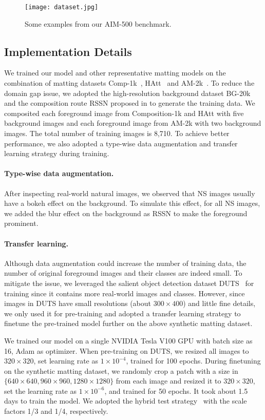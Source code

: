 \documentclass{article}
\begin{document}
\begin{figure}[t]
    \texttt{[image: dataset.jpg]}
    \caption{Some examples from our AIM-500 benchmark.}
    \label{fig:dataset}
\end{figure}


\subsection{Implementation Details}

We trained our model and other representative matting models on the combination of matting datasets Comp-1k~\cite{xu2017deep}, HAtt~\cite{Qiao_2020_CVPR} and AM-2k~\cite{gfm}. To reduce the domain gap issue, we adopted the high-resolution background dataset BG-20k and the composition route RSSN proposed in \cite{gfm} to generate the training data. We composited each foreground image from Composition-1k and HAtt with five background images and each foreground image from AM-2k with two background images. The total number of training images is 8,710. To achieve better performance, we also adopted a type-wise data augmentation and transfer learning strategy during training.

\paragraph{Type-wise data augmentation.}After inspecting real-world natural images, we observed that NS images usually have a bokeh effect on the background. To simulate this effect, for all NS images, we added the blur effect on the background as RSSN to make the foreground prominent.

\paragraph{Transfer learning.}Although data augmentation could increase the number of training data, the number of original foreground images and their classes are indeed small. To mitigate the issue, we leveraged the salient object detection dataset DUTS~\cite{duts} for training since it contains more real-world images and classes. However, since images in DUTS have small resolutions (about $300\times400$) and little fine details, we only used it for pre-training and adopted a transfer learning strategy to finetune the pre-trained model further on the above synthetic matting dataset.


We trained our model on a single NVIDIA Tesla V100 GPU with batch size as 16, Adam as optimizer. When pre-training on DUTS, we resized all images to $320\times320$, set learning rate as $1\times10^{-4}$, trained for 100 epochs. During finetuning on the synthetic matting dataset, we randomly crop a patch with a size in $\{640\times640, 960\times960, 1280\times1280\}$ from each image and resized it to $320\times320$, set the learning rate as $1\times10^{-6}$, and trained for 50 epochs. It took about 1.5 days to train the model. We adopted the hybrid test strategy~\cite{gfm} with the scale factors 1/3 and 1/4, respectively.
\end{document}
